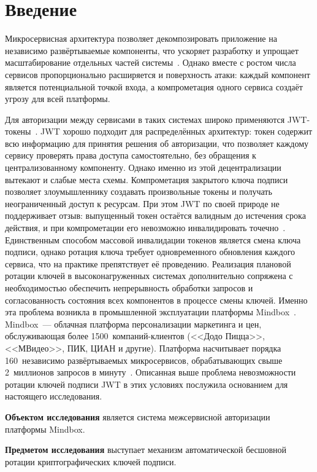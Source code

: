 \chapter*{Введение}

Микросервисная архитектура позволяет декомпозировать приложение на независимо развёртываемые
компоненты, что ускоряет разработку и упрощает масштабирование отдельных частей системы~\cite{Stojanov2024}.
Однако вместе с ростом числа сервисов пропорционально расширяется и поверхность атаки:
каждый компонент является потенциальной точкой входа, а компрометация одного сервиса создаёт угрозу для всей платформы.

Для авторизации между сервисами в таких системах широко применяются JWT-токены~\cite{OpenIDConnect}.
JWT хорошо подходит для распределённых архитектур:
токен содержит всю информацию для принятия решения об авторизации,
что позволяет каждому сервису проверять права доступа самостоятельно,
без обращения к централизованному компоненту.
Однако именно из этой децентрализации вытекают и слабые места схемы.
Компрометация закрытого ключа подписи позволяет злоумышленнику
создавать произвольные токены и получать неограниченный доступ к ресурсам.
При этом JWT по своей природе не поддерживает отзыв:
выпущенный токен остаётся валидным до истечения срока действия,
и при компрометации его невозможно инвалидировать точечно~\cite{Vencauskas2023}.
Единственным способом массовой инвалидации токенов
является смена ключа подписи,
однако ротация ключа требует одновременного обновления каждого сервиса,
что на практике препятствует её проведению.
Реализация плановой ротации ключей в высоконагруженных системах
дополнительно сопряжена с необходимостью обеспечить непрерывность обработки запросов
и согласованность состояния всех компонентов в процессе смены ключей.
Именно эта проблема возникла в промышленной эксплуатации платформы Mindbox~\cite{Mindbox}.
Mindbox~--- облачная платформа персонализации маркетинга и цен,
обслуживающая более 1500~компаний-клиентов
(<<Додо Пицца>>, <<МВидео>>, ПИК, ЦИАН и другие).
Платформа насчитывает порядка 160~независимо развёртываемых микросервисов,
обрабатывающих свыше 2~миллионов запросов в минуту~\cite{MindboxResults2022}.
Описанная выше проблема невозможности ротации ключей подписи JWT
в этих условиях послужила основанием для настоящего исследования.

\textbf{Объектом исследования} является система межсервисной авторизации платформы Mindbox.

\textbf{Предметом исследования} выступает механизм автоматической бесшовной ротации криптографических ключей подписи.

